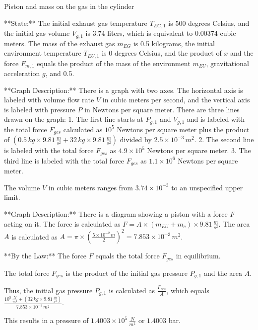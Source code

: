 Piston and mass on the gas in the cylinder

**State:**
The initial exhaust gas temperature \( T_{EG,1} \) is 500 degrees Celsius, and the initial gas volume \( V_{g,1} \) is 3.74 liters, which is equivalent to 0.00374 cubic meters.
The mass of the exhaust gas \( m_{EG} \) is 0.5 kilograms, the initial environment temperature \( T_{EU,1} \) is 0 degrees Celsius, and the product of \( x \) and the force \( F_{m,1} \) equals the product of the mass of the environment \( m_{EU} \), gravitational acceleration \( g \), and 0.5.

**Graph Description:**
There is a graph with two axes. The horizontal axis is labeled with volume flow rate \( V \) in cubic meters per second, and the vertical axis is labeled with pressure \( P \) in Newtons per square meter. There are three lines drawn on the graph:
1. The first line starts at \( P_{g,1} \) and \( V_{g,1} \) and is labeled with the total force \( F_{ges} \) calculated as \( 10^5 \) Newtons per square meter plus the product of \( (0.5 \, kg \times 9.81 \, \frac{m}{s^2} + 32 \, kg \times 9.81 \, \frac{m}{s^2}) \) divided by \( 2.5 \times 10^{-3} \, m^2 \).
2. The second line is labeled with the total force \( F_{ges} \) as \( 4.9 \times 10^5 \) Newtons per square meter.
3. The third line is labeled with the total force \( F_{ges} \) as \( 1.1 \times 10^6 \) Newtons per square meter.

The volume \( V \) in cubic meters ranges from \( 3.74 \times 10^{-3} \) to an unspecified upper limit.

**Graph Description:**
There is a diagram showing a piston with a force \( F \) acting on it. The force is calculated as \( F = A \times (m_{EU} + m_{c}) \times 9.81 \, \frac{m}{s^2} \). The area \( A \) is calculated as \( A = \pi \times \left(\frac{5 \times 10^{-2} \, m}{2}\right)^2 = 7.853 \times 10^{-3} \, m^2 \).

**By the Law:**
The force \( F \) equals the total force \( F_{ges} \) in equilibrium.

The total force \( F_{ges} \) is the product of the initial gas pressure \( P_{g,1} \) and the area \( A \).

Thus, the initial gas pressure \( P_{g,1} \) is calculated as \( \frac{F_{ges}}{A} \), which equals \( \frac{10^5 \, \frac{N}{m^2} + (32 \, kg \times 9.81 \, \frac{m}{s^2})}{7.853 \times 10^{-3} \, m^2} \).

This results in a pressure of \( 1.4003 \times 10^5 \, \frac{N}{m^2} \) or \( 1.4003 \) bar.